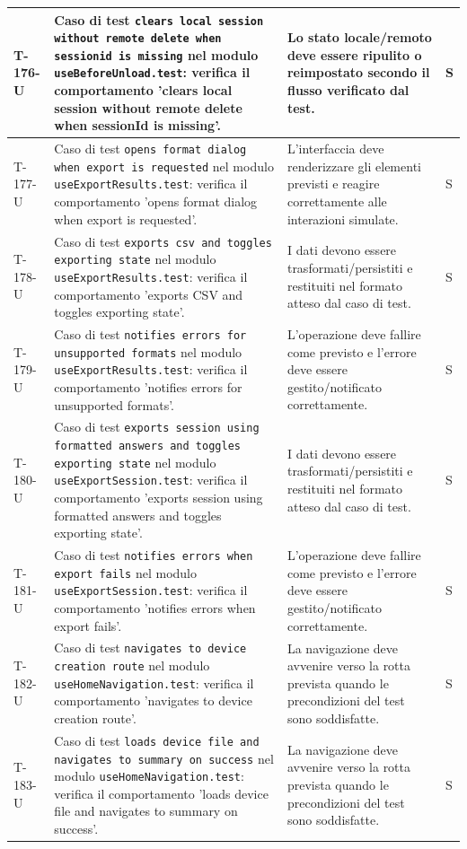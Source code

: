 \documentclass[a4paper,12pt]{article}
\begin{document}
{{\begin{longtable}{|>{\RaggedRight\arraybackslash}p{1.55cm}|>{\RaggedRight\arraybackslash}p{8.0cm}|>{\RaggedRight\arraybackslash}p{4.6cm}|>{\RaggedRight\arraybackslash}p{1.2cm}|}
        \hline
        T-176-U & Caso di test \texttt{clears local session without remote delete when sessionid is missing} nel modulo \texttt{useBeforeUnload.test}: verifica il comportamento 'clears local session without remote delete when sessionId is missing'. & Lo stato locale/remoto deve essere ripulito o reimpostato secondo il flusso verificato dal test. & S \\
        \hline
        T-177-U & Caso di test \texttt{opens format dialog when export is requested} nel modulo \texttt{useExportResults.test}: verifica il comportamento 'opens format dialog when export is requested'. & L'interfaccia deve renderizzare gli elementi previsti e reagire correttamente alle interazioni simulate. & S \\
        \hline
        T-178-U & Caso di test \texttt{exports csv and toggles exporting state} nel modulo \texttt{useExportResults.test}: verifica il comportamento 'exports CSV and toggles exporting state'. & I dati devono essere trasformati/persistiti e restituiti nel formato atteso dal caso di test. & S \\
        \hline
        T-179-U & Caso di test \texttt{notifies errors for unsupported formats} nel modulo \texttt{useExportResults.test}: verifica il comportamento 'notifies errors for unsupported formats'. & L'operazione deve fallire come previsto e l'errore deve essere gestito/notificato correttamente. & S \\
        \hline
        T-180-U & Caso di test \texttt{exports session using formatted answers and toggles exporting state} nel modulo \texttt{useExportSession.test}: verifica il comportamento 'exports session using formatted answers and toggles exporting state'. & I dati devono essere trasformati/persistiti e restituiti nel formato atteso dal caso di test. & S \\
        \hline
        T-181-U & Caso di test \texttt{notifies errors when export fails} nel modulo \texttt{useExportSession.test}: verifica il comportamento 'notifies errors when export fails'. & L'operazione deve fallire come previsto e l'errore deve essere gestito/notificato correttamente. & S \\
        \hline
        T-182-U & Caso di test \texttt{navigates to device creation route} nel modulo \texttt{useHomeNavigation.test}: verifica il comportamento 'navigates to device creation route'. & La navigazione deve avvenire verso la rotta prevista quando le precondizioni del test sono soddisfatte. & S \\
        \hline
        T-183-U & Caso di test \texttt{loads device file and navigates to summary on success} nel modulo \texttt{useHomeNavigation.test}: verifica il comportamento 'loads device file and navigates to summary on success'. & La navigazione deve avvenire verso la rotta prevista quando le precondizioni del test sono soddisfatte. & S \\

\end{longtable}}}
\end{document}
